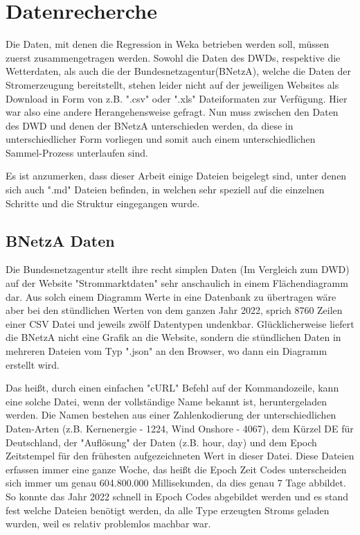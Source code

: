 \documentclass[letterpaper]{article} %
\begin{document}
\section*{Datenrecherche}
        Die Daten, mit denen die Regression in Weka betrieben werden soll, müssen zuerst zusammengetragen werden. Sowohl die Daten des DWDs, respektive die Wetterdaten, als auch die der Bundesnetzagentur(BNetzA), welche die Daten der Stromerzeugung bereitstellt, stehen leider nicht auf der jeweiligen Websites als Download in Form von z.B. ".csv" oder ".xls" Dateiformaten zur Verfügung. Hier war also eine andere Herangehensweise gefragt. Nun muss zwischen den Daten des DWD und denen der BNetzA unterschieden werden, da diese in unterschiedlicher Form vorliegen und somit auch einem unterschiedlichen Sammel-Prozess unterlaufen sind.

        Es ist anzumerken, dass dieser Arbeit einige Dateien beigelegt sind, unter denen sich auch ".md" Dateien befinden, in welchen sehr speziell auf die einzelnen Schritte und die Struktur eingegangen wurde.


        \subsection*{BNetzA Daten}
        Die Bundesnetzagentur stellt ihre recht simplen Daten (Im Vergleich zum DWD) auf der Website "Strommarktdaten" sehr anschaulich in einem Flächendiagramm dar. Aus solch einem Diagramm Werte in eine Datenbank zu übertragen wäre aber bei den stündlichen Werten von dem ganzen Jahr 2022, sprich 8760 Zeilen einer CSV Datei und jeweils zwölf Datentypen undenkbar. Glücklicherweise liefert die BNetzA nicht eine Grafik an die Website, sondern die stündlichen Daten in mehreren Dateien vom Typ ".json" an den Browser, wo dann ein Diagramm erstellt wird.

        Das heißt, durch einen einfachen "cURL" Befehl auf der Kommandozeile, kann eine solche Datei, wenn der vollständige Name bekannt ist, heruntergeladen werden. Die Namen bestehen aus einer Zahlenkodierung der unterschiedlichen Daten-Arten (z.B. Kernenergie - 1224, Wind Onshore - 4067), dem Kürzel DE für Deutschland, der "Auflösung" der Daten (z.B. hour, day) und dem Epoch Zeitstempel für den frühesten aufgezeichneten Wert in dieser Datei.
        Diese Dateien erfassen immer eine ganze Woche, das heißt die Epoch Zeit Codes unterscheiden sich immer um genau 604.800.000 Millisekunden, da dies genau 7 Tage abbildet. So konnte das Jahr 2022 schnell in Epoch Codes abgebildet werden und es stand fest welche Dateien benötigt werden, da alle Type erzeugten Stroms geladen wurden, weil es relativ problemlos machbar war.
        
\end{document}

